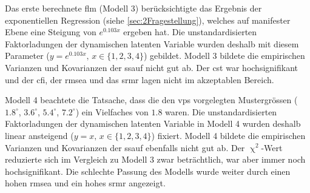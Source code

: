 \documentclass[11pt, twoside, a4paper]{book}		%
\begin{document}
Das erste berechnete \gls{flm} (Modell 3) berücksichtigte das Ergebnis der exponentiellen Regression (siehe \autoref{sec:2Fragestellung}), welches auf manifester Ebene eine Steigung von $e^{0.103x}$ ergeben hat. Die unstandardisierten Faktorladungen der dynamischen latenten Variable wurden deshalb mit diesem Parameter ($y=e^{0.103x},\,x\in\{1, 2, 3, 4\}$) gebildet. Modell 3 bildete die empirischen Varianzen und Kovarianzen der \gls{ssauf} nicht gut ab. Der \gls{cst} war hochsignifikant und der \gls{cfi}, der \gls{rmsea} und das \gls{srmr} lagen nicht im akzeptablen Bereich.

Modell 4 beachtete die Tatsache, dass die den \glspl{vp} vorgelegten Mustergrössen ($1.8^{\circ}$, $3.6^{\circ}$, $5.4^{\circ}$, $7.2^{\circ}$) ein Vielfaches von $1.8$ waren.
Die unstandardisierten Faktorladungen der dynamischen latenten Variable in Modell 4 wurden deshalb linear ansteigend ($y=x,\,x\in\{1, 2, 3, 4\}$) fixiert. Modell 4 bildete die empirischen Varianzen und Kovarianzen der \gls{ssauf} ebenfalls nicht gut ab. Der $\upchi^2$-Wert reduzierte sich im Vergleich zu Modell 3 zwar beträchtlich, war aber immer noch hochsignifikant. Die schlechte Passung des Modells wurde weiter durch einen hohen \gls{rmsea} und ein hohes \gls{srmr} angezeigt.
\end{document}
